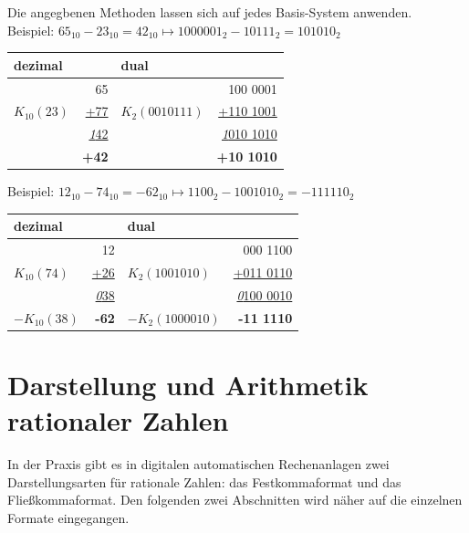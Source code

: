 \documentclass[11pt,a4paper]{scrreprt}
\begin{document}
Die angegbenen Methoden lassen sich auf jedes Basis-System anwenden. \\ Beispiel: $65_{10} - 23_{10} = 42_{10} \mapsto 1000001_2 - 10111_2 = 101010_2$ \\
\begin{center}
\begin{tabular}{lr|lr}
dezimal                           &      & dual             &                                 \\ \hline
                                  &  65  &                  &                       100 0001  \\
$K_{10}(23)$ &           \underline{+77} & $K_2(001 0111)$  &           \underline{+110 1001} \\
             & \underline{ \textit{1}42} &                  & \underline{ \textit{1}010 1010} \\
             &              \textbf{+42} &                  &               \textbf{+10 1010} \\
\end{tabular}
\end{center}
Beispiel: $12_{10} - 74_{10} = -62_{10} \mapsto 1100_2 - 100 1010_2 = -11 1110_2$
\begin{center}
\begin{tabular}{lr|lr}
dezimal       &                           & dual              &                                 \\ \hline
              &                       12  &                   &                       000 1100  \\
$K_{10}(74)$  &           \underline{+26} & $K_2(100 1010)$   &           \underline{+011 0110} \\
              & \underline{ \textit{0}38} &                   & \underline{ \textit{0}100 0010} \\
$-K_{10}(38)$ &              \textbf{-62} & $-K_2(100 0010)$  &               \textbf{-11 1110} \\
\end{tabular}
\end{center}


\chapter{Darstellung und Arithmetik rationaler Zahlen}
In der Praxis gibt es in digitalen automatischen Rechenanlagen zwei Darstellungsarten für rationale Zahlen: das Festkommaformat und das Fließkommaformat. Den folgenden zwei Abschnitten wird näher auf die einzelnen Formate eingegangen.
\end{document}
